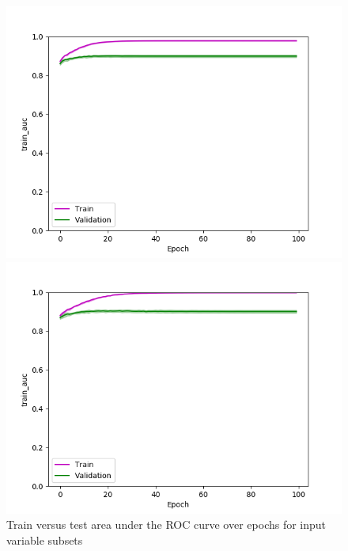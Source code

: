 \def\year{2017}\relax \documentclass[letterpaper]{article}
\begin{document}
\begin{figure}
\begin{minipage}{.24\textwidth}
  \centering
\includegraphics[width=\textwidth]{pics/d3_train_auc_mean_train_test.png}
\caption{$D_3$}\label{fig:d3acctraintest}
\end{minipage}
\begin{minipage}{.01\textwidth}
\end{minipage}
\begin{minipage}{.24\textwidth}
  \centering
\includegraphics[width=\textwidth]{pics/d4_train_auc_mean_train_test.png}
\caption{$D_4$}\label{fig:d4acctraintest}
\end{minipage}
\caption{Train versus test area under the ROC curve over epochs for input variable subsets}\label{fig:traintestauc}
\end{figure}
\end{document}
